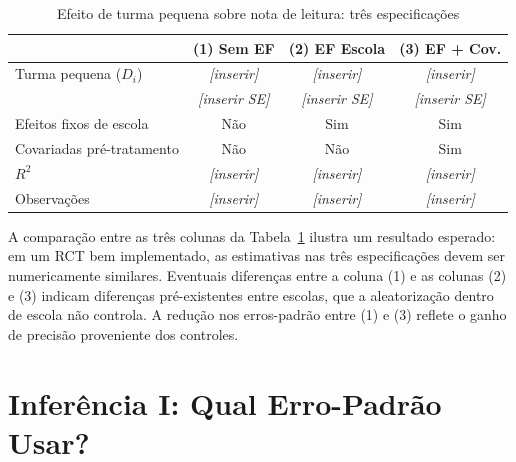 \begin{table}[H]
\centering
\caption{Efeito de turma pequena sobre nota de leitura: três especificações}
\label{tab:spec_comparacao}
\begin{tabular}{lccc}
\toprule
 & (1) Sem EF & (2) EF Escola & (3) EF + Cov. \\
\midrule
Turma pequena ($D_i$)
  & \textit{[inserir]} & \textit{[inserir]} & \textit{[inserir]} \\
  & \textit{[inserir SE]} & \textit{[inserir SE]} & \textit{[inserir SE]} \\[4pt]
Efeitos fixos de escola & Não & Sim & Sim \\
Covariadas pré-tratamento & Não & Não & Sim \\
$R^2$ & \textit{[inserir]} & \textit{[inserir]} & \textit{[inserir]} \\
Observações & \textit{[inserir]} & \textit{[inserir]} & \textit{[inserir]} \\
\bottomrule
\end{tabular}

\vspace{4pt}
\end{table}

A comparação entre as três colunas da Tabela~\ref{tab:spec_comparacao} ilustra um resultado esperado: em um RCT bem implementado, as estimativas nas três especificações devem ser numericamente similares. Eventuais diferenças entre a coluna (1) e as colunas (2) e (3) indicam diferenças pré-existentes entre escolas, que a aleatorização dentro de escola não controla. A redução nos erros-padrão entre (1) e (3) reflete o ganho de precisão proveniente dos controles.


\section{Inferência I: Qual Erro-Padrão Usar?}
\label{sec:star_ep}

